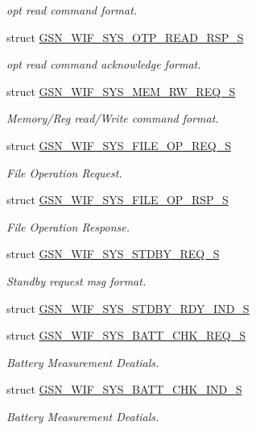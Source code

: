 \begin{DoxyCompactItemize}
\begin{DoxyCompactList}\small\item\em opt read command format. \end{DoxyCompactList}\item 
struct \hyperlink{a00359}{GSN\_\-WIF\_\-SYS\_\-OTP\_\-READ\_\-RSP\_\-S}
\begin{DoxyCompactList}\small\item\em opt read command acknowledge format. \end{DoxyCompactList}\item 
struct \hyperlink{a00357}{GSN\_\-WIF\_\-SYS\_\-MEM\_\-RW\_\-REQ\_\-S}
\begin{DoxyCompactList}\small\item\em Memory/Reg read/Write command format. \end{DoxyCompactList}\item 
struct \hyperlink{a00350}{GSN\_\-WIF\_\-SYS\_\-FILE\_\-OP\_\-REQ\_\-S}
\begin{DoxyCompactList}\small\item\em File Operation Request. \end{DoxyCompactList}\item 
struct \hyperlink{a00351}{GSN\_\-WIF\_\-SYS\_\-FILE\_\-OP\_\-RSP\_\-S}
\begin{DoxyCompactList}\small\item\em File Operation Response. \end{DoxyCompactList}\item 
struct \hyperlink{a00364}{GSN\_\-WIF\_\-SYS\_\-STDBY\_\-REQ\_\-S}
\begin{DoxyCompactList}\small\item\em Standby request msg format. \end{DoxyCompactList}\item 
struct \hyperlink{a00363}{GSN\_\-WIF\_\-SYS\_\-STDBY\_\-RDY\_\-IND\_\-S}
\item 
struct \hyperlink{a00346}{GSN\_\-WIF\_\-SYS\_\-BATT\_\-CHK\_\-REQ\_\-S}
\begin{DoxyCompactList}\small\item\em Battery Measurement Deatials. \end{DoxyCompactList}\item 
struct \hyperlink{a00345}{GSN\_\-WIF\_\-SYS\_\-BATT\_\-CHK\_\-IND\_\-S}
\begin{DoxyCompactList}\small\item\em Battery Measurement Deatials. \end{DoxyCompactList}\end{DoxyCompactItemize}
